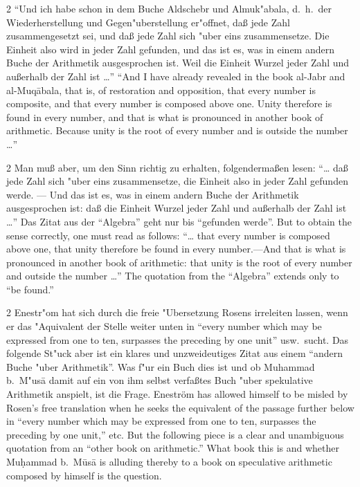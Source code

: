 \documentclass[10pt,a4paper]{article}
\renewcommand{\switchcolumn}{\syncronize\nointerlineskip\columnbreak}
\newcommand{\enquote}[1]{``#1''}
\begin{document}
\begin{paracol}{2}
\enquote{Und ich habe schon in dem Buche Aldschebr und Almuk"abala, d.\ h.\ der Wiederherstellung und Gegen"uberstellung er"offnet, da\ss{} jede Zahl zusammengesetzt sei, und da\ss{} jede Zahl sich "uber eins zusammensetze. Die Einheit also wird in jeder Zahl gefunden, und das ist es, was in einem andern Buche der Arithmetik ausgesprochen ist. Weil die Einheit Wurzel jeder Zahl und au\ss{}erhalb der Zahl ist \ldots{}}
\switchcolumn
``And I have already revealed in the book al-Jabr and al-Muq\=abala, that is, of restoration and opposition, that every number is composite, and that every number is composed above one. Unity therefore is found in every number, and that is what is pronounced in another book of arithmetic. Because unity is the root of every number and is outside the number \ldots{}''
\end{paracol}

\begin{paracol}{2}
Man mu\ss{} aber, um den Sinn richtig zu erhalten, folgenderma\ss{}en lesen: \enquote{\ldots{} da\ss{} jede Zahl sich "uber eins zusammensetze, die Einheit also in jeder Zahl gefunden werde. --- Und das ist es, was in einem andern Buche der Arithmetik ausgesprochen ist: da\ss{} die Einheit Wurzel jeder Zahl und au\ss{}erhalb der Zahl ist \ldots{}} Das Zitat aus der \enquote{Algebra} geht nur bis \enquote{gefunden werde}.
\switchcolumn
But to obtain the sense correctly, one must read as follows: ``\ldots{} that every number is composed above one, that unity therefore be found in every number.---And that is what is pronounced in another book of arithmetic: that unity is the root of every number and outside the number \ldots{}'' The quotation from the ``Algebra'' extends only to ``be found.''
\end{paracol}

\begin{paracol}{2}
Enestr"om hat sich durch die freie "Ubersetzung Rosens irreleiten lassen, wenn er das "Aquivalent der Stelle weiter unten in \enquote{every number which may be expressed from one to ten, surpasses the preceding by one unit} usw.\ sucht. Das folgende St"uck aber ist ein klares und unzweideutiges Zitat aus einem \enquote{andern Buche "uber Arithmetik}. Was f"ur ein Buch dies ist und ob Muhammad b.\ M"us\=a damit auf ein von ihm selbst verfa\ss{}tes Buch "uber spekulative Arithmetik anspielt, ist die Frage.
\switchcolumn
Enestr\"om has allowed himself to be misled by Rosen's free translation when he seeks the equivalent of the passage further below in ``every number which may be expressed from one to ten, surpasses the preceding by one unit,'' etc. But the following piece is a clear and unambiguous quotation from an ``other book on arithmetic.'' What book this is and whether Mu\d{h}ammad b.\ M\=us\=a is alluding thereby to a book on speculative arithmetic composed by himself is the question.
\end{paracol}
\end{document}
